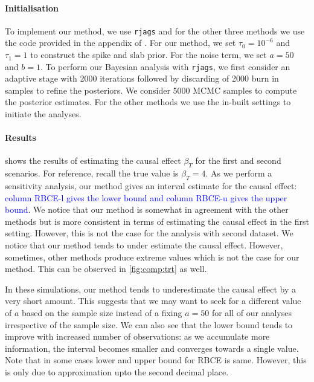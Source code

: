 \documentclass[preprint,12pt]{elsarticle}
\newcommand{\added}[1]{\textcolor{blue}{#1}}
\begin{document}
\paragraph{Initialisation} 
To implement our method, we use \texttt{rjags} \added{\citep{rjags2023}} and for the other three
methods we use the code provided in the appendix of \citep{koch2020}.
For our method, we set $\tau_0=10^{-6}$ and $\tau_1=1$ to construct the
spike and slab prior.
For the noise term, we set $a=50$ and $b=1$.
To perform 
our Bayesian analysis with \texttt{rjags}, we first consider an adaptive 
stage with 2000 iterations followed by discarding of 2000 burn in samples 
to refine the posteriors. We consider 5000 MCMC samples to compute the
posterior estimates. For the other methods we use the in-built settings 
to initiate the analyses.

\paragraph{Results}
 shows the results of estimating the causal effect $\beta_T$
for the first and second scenarios.
For reference, recall the true value is $\beta_T=4$. 
As we perform a sensitivity analysis,
our method gives an interval estimate for the causal effect:
\added{column RBCE-l gives the lower bound
and column RBCE-u gives the upper bound}. We notice that our method is 
somewhat in agreement with the other methods but is more consistent
in terms of estimating the causal effect in the first setting. However, this is not the
case for the analysis with second dataset. We notice that our method tends to under
estimate the causal effect. However, sometimes, other methods produce extreme 
values which is not the case for our method. This can be observed in \cref{fig:comp:trt} as well. %

In these simulations, our method tends
to underestimate the causal effect by a very short amount.
This suggests that
we may want to seek for a different value of $a$ based on the sample size
instead of a fixing $a=50$ for all of our analyses irrespective of the
sample size.
We can also see that the lower bound tends to improve
with increased number of observations: as we accumulate
more information, the interval becomes smaller and converges towards
a single value. Note that in some cases lower and upper bound for 
RBCE is same. However, this is only due to approximation upto the
second decimal place.
\end{document}

